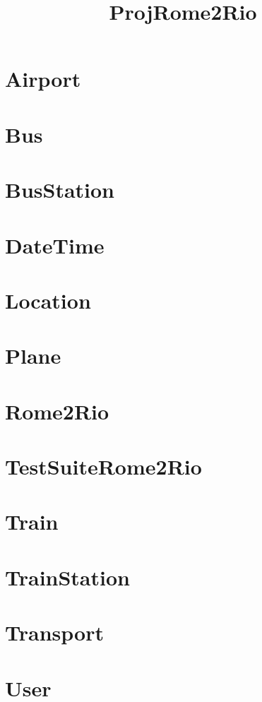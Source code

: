 \documentclass{article}
\begin{document}
\title{ProjRome2Rio}
\author{}
\maketitle
\tableofcontents

\section{Airport}

\section{Bus}

\section{BusStation}

\section{DateTime}

\section{Location}

\section{Plane}

\section{Rome2Rio}

\section{TestSuiteRome2Rio}

\section{Train}

\section{TrainStation}

\section{Transport}

\section{User}

\end{document}
